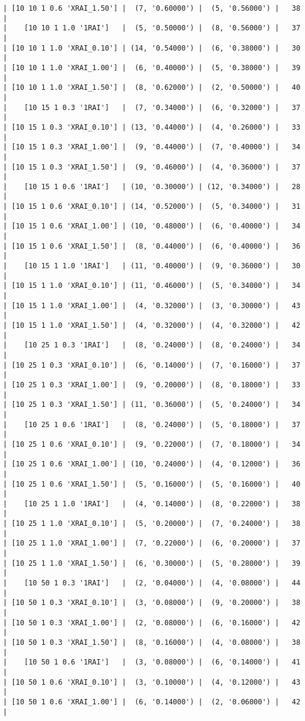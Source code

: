 \documentclass{article}
\begin{document}
\begin{verbatim}
| [10 10 1 0.6 'XRAI_1.50'] |  (7, '0.60000') |  (5, '0.56000') |   38  |
|    [10 10 1 1.0 '1RAI']   |  (5, '0.50000') |  (8, '0.56000') |   37  |
| [10 10 1 1.0 'XRAI_0.10'] | (14, '0.54000') |  (6, '0.38000') |   30  |
| [10 10 1 1.0 'XRAI_1.00'] |  (6, '0.40000') |  (5, '0.38000') |   39  |
| [10 10 1 1.0 'XRAI_1.50'] |  (8, '0.62000') |  (2, '0.50000') |   40  |
|    [10 15 1 0.3 '1RAI']   |  (7, '0.34000') |  (6, '0.32000') |   37  |
| [10 15 1 0.3 'XRAI_0.10'] | (13, '0.44000') |  (4, '0.26000') |   33  |
| [10 15 1 0.3 'XRAI_1.00'] |  (9, '0.44000') |  (7, '0.40000') |   34  |
| [10 15 1 0.3 'XRAI_1.50'] |  (9, '0.46000') |  (4, '0.36000') |   37  |
|    [10 15 1 0.6 '1RAI']   | (10, '0.30000') | (12, '0.34000') |   28  |
| [10 15 1 0.6 'XRAI_0.10'] | (14, '0.52000') |  (5, '0.34000') |   31  |
| [10 15 1 0.6 'XRAI_1.00'] | (10, '0.48000') |  (6, '0.40000') |   34  |
| [10 15 1 0.6 'XRAI_1.50'] |  (8, '0.44000') |  (6, '0.40000') |   36  |
|    [10 15 1 1.0 '1RAI']   | (11, '0.40000') |  (9, '0.36000') |   30  |
| [10 15 1 1.0 'XRAI_0.10'] | (11, '0.46000') |  (5, '0.34000') |   34  |
| [10 15 1 1.0 'XRAI_1.00'] |  (4, '0.32000') |  (3, '0.30000') |   43  |
| [10 15 1 1.0 'XRAI_1.50'] |  (4, '0.32000') |  (4, '0.32000') |   42  |
|    [10 25 1 0.3 '1RAI']   |  (8, '0.24000') |  (8, '0.24000') |   34  |
| [10 25 1 0.3 'XRAI_0.10'] |  (6, '0.14000') |  (7, '0.16000') |   37  |
| [10 25 1 0.3 'XRAI_1.00'] |  (9, '0.20000') |  (8, '0.18000') |   33  |
| [10 25 1 0.3 'XRAI_1.50'] | (11, '0.36000') |  (5, '0.24000') |   34  |
|    [10 25 1 0.6 '1RAI']   |  (8, '0.24000') |  (5, '0.18000') |   37  |
| [10 25 1 0.6 'XRAI_0.10'] |  (9, '0.22000') |  (7, '0.18000') |   34  |
| [10 25 1 0.6 'XRAI_1.00'] | (10, '0.24000') |  (4, '0.12000') |   36  |
| [10 25 1 0.6 'XRAI_1.50'] |  (5, '0.16000') |  (5, '0.16000') |   40  |
|    [10 25 1 1.0 '1RAI']   |  (4, '0.14000') |  (8, '0.22000') |   38  |
| [10 25 1 1.0 'XRAI_0.10'] |  (5, '0.20000') |  (7, '0.24000') |   38  |
| [10 25 1 1.0 'XRAI_1.00'] |  (7, '0.22000') |  (6, '0.20000') |   37  |
| [10 25 1 1.0 'XRAI_1.50'] |  (6, '0.30000') |  (5, '0.28000') |   39  |
|    [10 50 1 0.3 '1RAI']   |  (2, '0.04000') |  (4, '0.08000') |   44  |
| [10 50 1 0.3 'XRAI_0.10'] |  (3, '0.08000') |  (9, '0.20000') |   38  |
| [10 50 1 0.3 'XRAI_1.00'] |  (2, '0.08000') |  (6, '0.16000') |   42  |
| [10 50 1 0.3 'XRAI_1.50'] |  (8, '0.16000') |  (4, '0.08000') |   38  |
|    [10 50 1 0.6 '1RAI']   |  (3, '0.08000') |  (6, '0.14000') |   41  |
| [10 50 1 0.6 'XRAI_0.10'] |  (3, '0.10000') |  (4, '0.12000') |   43  |
| [10 50 1 0.6 'XRAI_1.00'] |  (6, '0.14000') |  (2, '0.06000') |   42  |

\end{verbatim}
\end{document}
